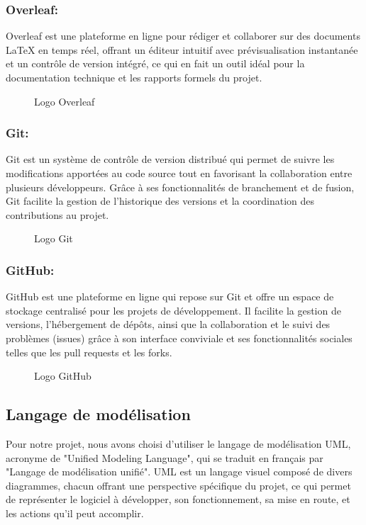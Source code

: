 \subsubsection*{Overleaf:}
Overleaf \cite{b23}est une plateforme en ligne pour rédiger et collaborer sur des documents LaTeX en temps réel, offrant un éditeur intuitif avec prévisualisation instantanée et un contrôle de version intégré, ce qui en fait un outil idéal pour la documentation technique et les rapports formels du projet.
\begin{figure}[H]
\centering
{}
\caption{Logo Overleaf}
\end{figure}

\subsubsection*{Git:}
Git\cite{b44} est un système de contrôle de version distribué qui permet de suivre les modifications apportées au code source tout en favorisant la collaboration entre plusieurs développeurs. Grâce à ses fonctionnalités de branchement et de fusion, Git facilite la gestion de l'historique des versions et la coordination des contributions au projet.
\begin{figure}[H]
\centering
{}
\caption{Logo Git}
\end{figure}

\subsubsection*{GitHub:}
GitHub\cite{b45} est une plateforme en ligne qui repose sur Git et offre un espace de stockage centralisé pour les projets de développement. Il facilite la gestion de versions, l’hébergement de dépôts, ainsi que la collaboration et le suivi des problèmes (issues) grâce à son interface conviviale et ses fonctionnalités sociales telles que les pull requests et les forks.
\begin{figure}[H]
\centering
{}
\caption{Logo GitHub}
\end{figure}

\subsection{Langage de modélisation}
Pour notre projet, nous avons choisi d'utiliser le langage de modélisation UML, acronyme de "Unified Modeling Language", qui se traduit en français par "Langage de modélisation unifié". UML est un langage visuel composé de divers diagrammes, chacun offrant une perspective spécifique du projet, ce qui permet de représenter le logiciel à développer, son fonctionnement, sa mise en route, et les actions qu'il peut accomplir.



